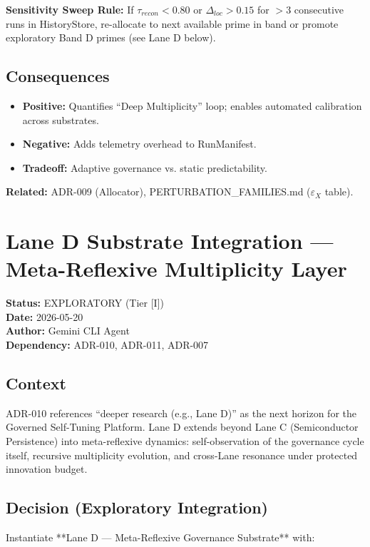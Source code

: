 \documentclass[11pt]{article}
\begin{document}
\textbf{Sensitivity Sweep Rule:}
If $\tau_{recon} < 0.80$ or $\Delta_{loc} > 0.15$ for $> 3$ consecutive runs in HistoryStore, re-allocate to next available prime in band or promote exploratory Band D primes (see Lane D below).

\subsection{Consequences}
\begin{itemize}
    \item \textbf{Positive:} Quantifies ``Deep Multiplicity'' loop; enables automated calibration across substrates.
    \item \textbf{Negative:} Adds telemetry overhead to RunManifest.
    \item \textbf{Tradeoff:} Adaptive governance vs. static predictability.
\end{itemize}

\textbf{Related:} ADR-009 (Allocator), PERTURBATION_FAMILIES.md ($\varepsilon_X$ table).

\section{Lane D Substrate Integration — Meta-Reflexive Multiplicity Layer}
\textbf{Status:} EXPLORATORY (Tier [I]) \\
\textbf{Date:} 2026-05-20 \\
\textbf{Author:} Gemini CLI Agent \\
\textbf{Dependency:} ADR-010, ADR-011, ADR-007

\subsection{Context}
ADR-010 references ``deeper research (e.g., Lane D)'' as the next horizon for the Governed Self-Tuning Platform. Lane D extends beyond Lane C (Semiconductor Persistence) into meta-reflexive dynamics: self-observation of the governance cycle itself, recursive multiplicity evolution, and cross-Lane resonance under protected innovation budget.

\subsection{Decision (Exploratory Integration)}
Instantiate **Lane D — Meta-Reflexive Governance Substrate** with:
\end{document}

